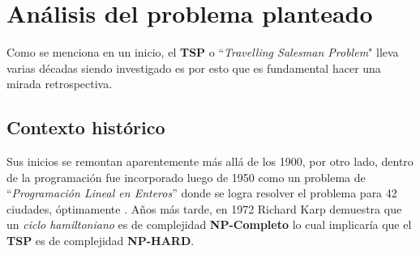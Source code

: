 
\titleformat{\chapter}[display]
    {\normalfont\Large\bfseries}{\filleft\chaptertitlename\ \thechapter}{20pt}{\Huge}
\chapter{Análisis del problema planteado}
    \justify    
        Como se menciona en un inicio, el \textbf{TSP} o ``\textit{Travelling Salesman Problem}" lleva varias décadas siendo investigado es por esto que es fundamental hacer una mirada retrospectiva. 
        
        \section{Contexto histórico}
            Sus inicios se remontan aparentemente más allá de los 1900, por otro lado, dentro de la programación fue incorporado luego de 1950 como un problema de ``\textit{Programación Lineal en Enteros}'' donde se logra resolver el problema para 42 ciudades, óptimamente \parencite{WikipediaTSP}.
            \newline
            \newline
            Años más tarde, en 1972 Richard Karp demuestra que un \textit{ciclo hamiltoniano} es de complejidad \textbf{NP-Completo} lo cual implicaría que el \textbf{TSP} es de complejidad \textbf{NP-HARD}.
            
